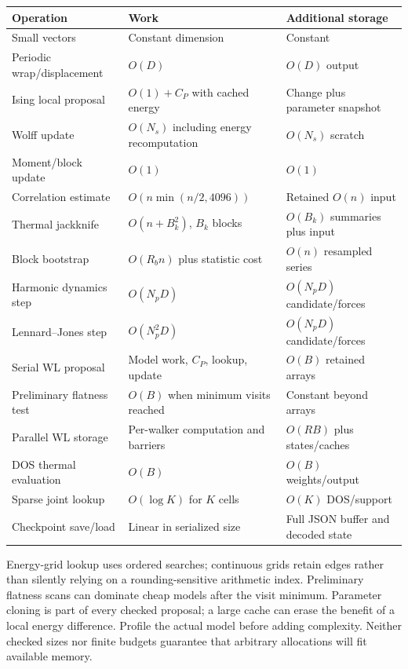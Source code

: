 \documentclass[11pt,a4paper,oneside]{report}
\begin{document}
\begin{longtable}{@{}P{0.30\textwidth}P{0.31\textwidth}P{0.32\textwidth}@{}}
\toprule Operation & Work & Additional storage\\\midrule\endhead
Small vectors & Constant dimension & Constant\\
Periodic wrap/displacement & $O(D)$ & $O(D)$ output\\
Ising local proposal & $O(1)+C_P$ with cached energy & Change plus parameter snapshot\\
Wolff update & $O(N_s)$ including energy recomputation & $O(N_s)$ scratch\\
Moment/block update & $O(1)$ & $O(1)$\\
Correlation estimate & $O(n\min(n/2,4096))$ & Retained $O(n)$ input\\
Thermal jackknife & $O(n+B_k^2)$, $B_k$ blocks & $O(B_k)$ summaries plus input\\
Block bootstrap & $O(R_b n)$ plus statistic cost & $O(n)$ resampled series\\
Harmonic dynamics step & $O(N_pD)$ & $O(N_pD)$ candidate/forces\\
Lennard--Jones step & $O(N_p^2D)$ & $O(N_pD)$ candidate/forces\\
Serial WL proposal & Model work, $C_P$, lookup, update & $O(B)$ retained arrays\\
Preliminary flatness test & $O(B)$ when minimum visits reached & Constant beyond arrays\\
Parallel WL storage & Per-walker computation and barriers & $O(RB)$ plus states/caches\\
DOS thermal evaluation & $O(B)$ & $O(B)$ weights/output\\
Sparse joint lookup & $O(\log K)$ for $K$ cells & $O(K)$ DOS/support\\
Checkpoint save/load & Linear in serialized size & Full JSON buffer and decoded state\\
\bottomrule
\end{longtable}

Energy-grid lookup uses ordered searches; continuous grids retain edges rather
than silently relying on a rounding-sensitive arithmetic index. Preliminary
flatness scans can dominate cheap models after the visit minimum. Parameter
cloning is part of every checked proposal; a large cache can erase the benefit
of a local energy difference. Profile the actual model before adding complexity.
Neither checked sizes nor finite budgets guarantee that arbitrary allocations
will fit available memory.
\end{document}
